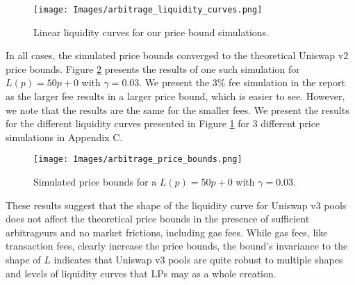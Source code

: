 \documentclass[11pt]{article}
\begin{document}
\begin{figure}[H]
    \centering
    \texttt{[image: Images/arbitrage\_liquidity\_curves.png]}
    \caption{Linear liquidity curves for our price bound simulations.}
    \label{fig:linear_liquidity_curves}
\end{figure}

In all cases, the simulated price bounds converged to the theoretical Uniswap v2 price bounds. Figure \ref{fig:price_bound_simulation} presents the results of one such simulation for $L(p) = 50p + 0$ with $\gamma = 0.03$. We present the 3\% fee simulation in the report as the larger fee results in a larger price bound, which is easier to see. However, we note that the results are the same for the smaller fees. We present the results for the different liquidity curves presented in Figure \ref{fig:linear_liquidity_curves} for 3 different price simulations in Appendix C.

\begin{figure}[H]
    \centering
    \texttt{[image: Images/arbitrage\_price\_bounds.png]}
    \caption{Simulated price bounds for a $L(p) = 50p + 0$ with $\gamma = 0.03$.}
    \label{fig:price_bound_simulation}
\end{figure}

These results suggest that the shape of the liquidity curve for Uniswap v3 pools does not affect the theoretical price bounds in the presence of sufficient arbitrageurs and no market frictions, including gas fees. While gas fees, like transaction fees, clearly increase the price bounds, the bound's invariance to the shape of $L$ indicates that Uniswap v3 pools are quite robust to multiple shapes and levels of liquidity curves that LPs may as a whole creation.
\end{document}
